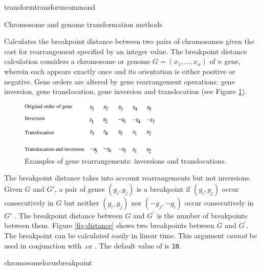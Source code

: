 \begin{command}{transform}{transformcommand}
\begin{arguments}
\begin{argumentgroup}{Chromosome and genome transformation methods}
                {Calculates the breakpoint distance \cite{blanchetteetal1997}
                between two pairs of chromosomes given the cost for rearrangement
                specified by an integer value.  The breakpoint distance calculation considers
                a chromosome or genome $G = (x_1, \ldots, x_n) $ of $n$ gene, wherein each
                 appears exactly once and its orientation is either positive or negative.  Gene
                orders are altered by gene rearrangement operations: gene inversion, gene translocation,
                gene inversion and translocation (see Figure \ref{fig:genomeRearrangement}).  
                \bigskip
                 \begin{figure} [!htbp]
   		        \begin{center}
        		    \includegraphics[width=0.6\textwidth]{doc/figures/genomeRearrangement.pdf}
    		    \end{center}
    		    \caption{Examples of gene rearrangements: inversions and translocations.}
		        \label{fig:genomeRearrangement}
		    \end{figure}

                The breakpoint distance takes into account rearrangements but not inversions.
                Given $G$ and $G'$, a pair of genes $(g_i, g_j)$ is a breakpoint if $(g_i, g_j)$ occur 
                consecutively in $G$ but neither $(g_i, g_j)$ nor $(-g_j, -g_i)$ occur
                consecutively in $G'$  \cite{sankoffandblanchette1998}.  The breakpoint distance between $G$
		        and $G^\prime$ is the number of breakpoints between them.  Figure \ref{fig:distance} 
                shows two breakpoints between $G$ and $G^\prime$. The breakpoint can be calculated 
                easily in linear time.  This argument \emph{cannot} be used in
                conjunction with .or . The default
                value of  is \texttt{10}.} 
                {chromosomelocusbreakpoint} 
            

\end{argumentgroup}
\end{arguments}
\end{command}
